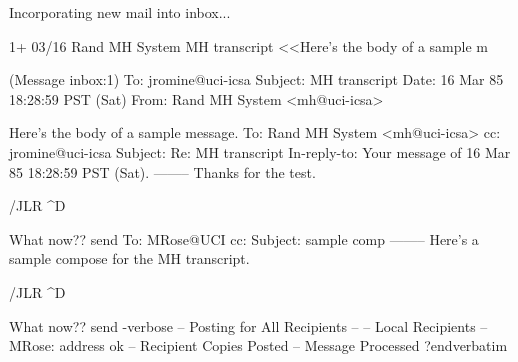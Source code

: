 
\verbatimlines
% inc
Incorporating new mail into inbox...

   1+ 03/16 Rand MH System    MH transcript  <<Here's the body of a sample m
					       
(Message inbox:1)
To: jromine@uci-icsa
Subject: MH transcript
Date: 16 Mar 85 18:28:59 PST (Sat)
From: Rand MH System <mh@uci-icsa>

Here's the body of a sample message.
To: Rand MH System <mh@uci-icsa>
cc: jromine@uci-icsa
Subject: Re: MH transcript
In-reply-to: Your message of 16 Mar 85 18:28:59 PST (Sat).
--------
Thanks for the test.

/JLR
^D

What now?? send
To: MRose@UCI
cc: 
Subject: sample comp
--------
Here's a sample compose for the MH transcript.

/JLR
^D

What now?? send -verbose
 -- Posting for All Recipients --
  -- Local Recipients --
  MRose: address ok
 -- Recipient Copies Posted --
Message Processed
?endverbatim
